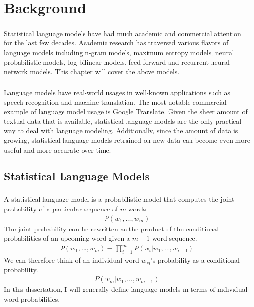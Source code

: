 
\chapter{Background}
\paragraph{}
Statistical language models have had much academic and commercial attention for the last few decades. Academic research has traversed various flavors of language models including n-gram models, maximum entropy models, neural probabilistic models, log-bilinear models, feed-forward and recurrent neural network models. This chapter will cover the above models.
\paragraph{}
Language models have real-world usages in well-known applications such as speech recognition and machine translation. The most notable commercial example of language model usage is Google Translate. Given the sheer amount of textual data that is available, statistical language models are the only practical way to deal with language modeling. Additionally, since the amount of data is growing,  statistical language models retrained on new data can become even more useful and more accurate over time.

\section{Statistical Language Models}
\paragraph{}
A statistical language model is a probabilistic model that computes the joint probability of a particular sequence of  $m$ words.  
\begin{align}
P(w_1, \dots ,w_m)
\end{align}
The joint probability can be rewritten as the product of the conditional probabilities of an upcoming word given a $m-1$ word sequence.
\begin{align}
P(w_1, \dots ,w_m) = \prod_{i=1}^m P(w_i | w_1,\dots, w_{i-1})
\end{align}
We can therefore think of an individual word $w_m$'s probability as a conditional probability.
\begin{align}
P(w_m | w_1,\dots, w_{m-1})
\end{align}
In this dissertation, I will generally define language models in terms of individual word probabilities.

